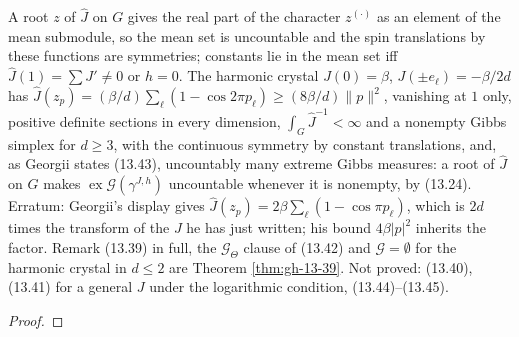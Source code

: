 \begin{theorem}
    \label{thm:gh-13-43}
    \leanok

    A root $z$ of $\hat J$ on $G$ gives the real part of the character $z^{(\cdot)}$ as an element
    of the mean submodule, so the mean set is uncountable and the spin translations by these
    functions are symmetries; constants lie in the mean set iff $\hat J(1) = \sum J' \neq 0$ or
    $h = 0$. The harmonic crystal $J(0) = \beta$, $J(\pm e_\ell) = -\beta/2d$ has
    $\hat J(z_p) = (\beta/d)\sum_\ell(1 - \cos 2\pi p_\ell) \geq (8\beta/d)\|p\|^2$, vanishing at
    $1$ only, positive definite sections in every dimension, $\int_G \hat J^{-1} < \infty$ and a
    nonempty Gibbs simplex for $d \geq 3$, with the continuous symmetry by constant translations,
    and, as Georgii states (13.43), uncountably many extreme Gibbs measures: a root of $\hat J$ on
    $G$ makes $\operatorname{ex}\mathcal G(\gamma^{J,h})$ uncountable whenever it is nonempty, by
    (13.24).
    Erratum: Georgii's display gives $\hat J(z_p) = 2\beta\sum_\ell(1 - \cos \pi p_\ell)$, which
    is $2d$ times the transform of the $J$ he has just written; his bound $4\beta|p|^2$ inherits
    the factor. Remark (13.39) in full, the $\mathcal G_\Theta$ clause of (13.42) and $\mathcal G = \emptyset$
    for the harmonic crystal in $d \leq 2$ are Theorem \ref{thm:gh-13-39}. Not proved: (13.40),
    (13.41) for a general $J$ under the logarithmic condition, (13.44)--(13.45).
\end{theorem}
\begin{proof}
    \leanok
\end{proof}

